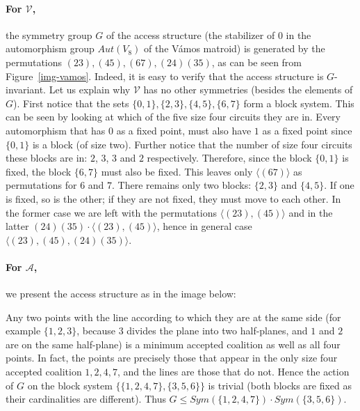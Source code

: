 \documentclass[11pt, a4paper]{kybernetika}
\begin{document}
	{\small
		\paragraph{For $\mathcal{V}$,} the symmetry group $G$ of the access structure (the stabilizer of $0$ in the automorphism group $Aut(V_8)$ of the V\'amos matroid) is generated by the permutations  $(23),(45),(67),(24)(35)$, as can be seen from Figure~\ref{img-vamos}. Indeed, 
		it is easy to verify that the access structure is $G$-invariant. Let us explain why $\mathcal{V}$ has no other symmetries (besides the elements of $G$).
		First notice that the sets $\{0,1\},\{2,3\},\{4,5\},\{6,7\}$ form a block system. This can be seen by looking at which of the five size four circuits they are in.
		Every automorphism that has $0$ as a fixed point, must also have $1$ as a fixed point since $\{0,1\}$ is a block (of size two).
		Further notice that the number of size four circuits these blocks are in: $2$, $3$, $3$ and $2$ respectively. Therefore, since the block $\{0,1\}$ is fixed, the block $\{6,7\}$ must also be fixed. This leaves only $\langle(67)\rangle$ as permutations for $6$ and $7$. 
		There remains only two blocks: $\{2,3\}$ and $\{4,5\}$. If one is fixed, so is the other; if they are not fixed, they must move to each other. In the former case we are left with the permutations $\langle(23),(45)\rangle$ and in the latter $(24)(35)\cdot\langle(23),(45)\rangle$, hence in general case $\langle(23),(45),(24)(35)\rangle$.
		
		\paragraph{For $\mathcal{A}$,} we present the access structure as in the image below:
		
		
		\smallskip
		
		Any two points with the line according to which they are at the same side (for example $\{1,2,3\}$, because $3$ divides the plane into two half-planes, and $1$ and $2$ are on the same half-plane) is a minimum accepted coalition as well as all four points. In fact, the points are precisely those that appear in the only size four accepted coalition $1,2,4,7$, and the lines are those that do not. Hence the action of $G$ on the block system $\{\{1,2,4,7\},\{3,5,6\}\}$ is trivial (both blocks are fixed as their cardinalities are different). Thus $G\le Sym(\{1,2,4,7\})\cdot Sym(\{3,5,6\})$.
		
}
\end{document}
